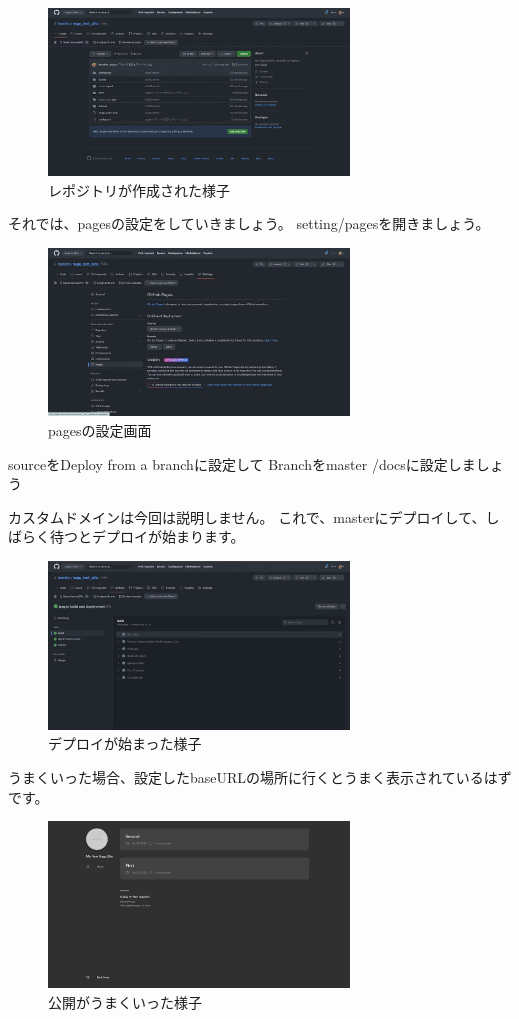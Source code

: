   \begin{figure}[H]
    \centering
    \includegraphics[width=8cm]{./image/02-chap6/git1.png}
    \caption{レポジトリが作成された様子}
    \label{chap6-git1-image}
  \end{figure}

  それでは、pagesの設定をしていきましょう。
  setting/pagesを開きましょう。

  \begin{figure}[H]
    \centering
    \includegraphics[width=8cm]{./image/02-chap6/git2.png}
    \caption{pagesの設定画面}
    \label{chap6-pages1-image}
  \end{figure}

  sourceをDeploy from a branchに設定して
  Branchをmaster /docsに設定しましょう

  カスタムドメインは今回は説明しません。
  これで、masterにデプロイして、しばらく待つとデプロイが始まります。

  \begin{figure}[H]
    \centering
    \includegraphics[width=8cm]{./image/02-chap6/git4.png}
    \caption{デプロイが始まった様子}
    \label{chap6-pages2-image}
  \end{figure}

  うまくいった場合、設定したbaseURLの場所に行くとうまく表示されているはずです。

  \begin{figure}[H]
    \centering
    \includegraphics[width=8cm]{./image/02-chap6/view_hugo.png}
    \caption{公開がうまくいった様子}
    \label{chap6-pages3-image}
  \end{figure}



